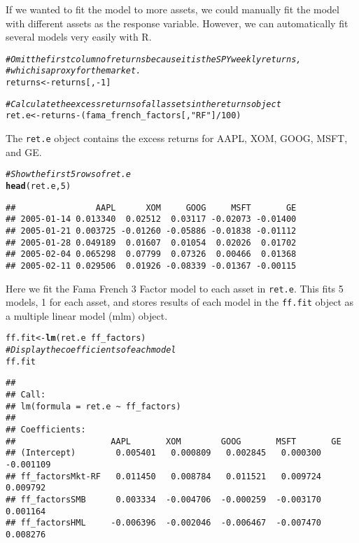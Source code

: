 \documentclass[a4paper]{article}\usepackage[]{graphicx}\usepackage[]{color}
\makeatletter
\newcommand{\hlstr}[1]{\textcolor[rgb]{0.192,0.494,0.8}{#1}}%
\newcommand{\hlcom}[1]{\textcolor[rgb]{0.678,0.584,0.686}{\textit{#1}}}%
\newcommand{\hlkwd}[1]{\textcolor[rgb]{0.737,0.353,0.396}{\textbf{#1}}}%
\newenvironment{kframe}{%
 \def\at@end@of@kframe{}%
 \ifinner\ifhmode%
  \def\at@end@of@kframe{\end{minipage}}%
  \begin{minipage}{\columnwidth}%
 \fi\fi%
 \def\FrameCommand##1{\hskip\@totalleftmargin \hskip-\fboxsep
 \colorbox{shadecolor}{##1}\hskip-\fboxsep
     \hskip-\linewidth \hskip-\@totalleftmargin \hskip\columnwidth}%
 \MakeFramed {\advance\hsize-\width
   \@totalleftmargin\z@ \linewidth\hsize
   \@setminipage}}%
 {\par\unskip\endMakeFramed%
 \at@end@of@kframe}
\newenvironment{knitrout}{}{} %
\makeatother
\begin{document}
If we wanted to fit the model to more assets, we could manually fit the model with different assets as the response variable. However, we can automatically fit several models very easily with R.

\begin{knitrout}
\color{fgcolor}\begin{kframe}
\begin{alltt}
\hlcom{# Omit the first column of returns because it is the SPY weekly returns,}
\hlcom{# which is a proxy for the market.}
returns <- returns[, -1]

\hlcom{# Calculate the excess returns of all assets in the returns object}
ret.e <- returns - (fama_french_factors[, \hlstr{"RF"}]/100) %*% \hlkwd{rep}(1, \hlkwd{ncol}(returns))
\end{alltt}
\end{kframe}
\end{knitrout}


The \verb"ret.e" object contains the excess returns for AAPL, XOM, GOOG, MSFT, and GE.
\begin{knitrout}
\color{fgcolor}\begin{kframe}
\begin{alltt}
\hlcom{# Show the first 5 rows of ret.e}
\hlkwd{head}(ret.e, 5)
\end{alltt}
\begin{verbatim}
##                AAPL      XOM     GOOG     MSFT       GE
## 2005-01-14 0.013340  0.02512  0.03117 -0.02073 -0.01400
## 2005-01-21 0.003725 -0.01260 -0.05886 -0.01838 -0.01112
## 2005-01-28 0.049189  0.01607  0.01054  0.02026  0.01702
## 2005-02-04 0.065298  0.07799  0.07326  0.00466  0.01368
## 2005-02-11 0.029506  0.01926 -0.08339 -0.01367 -0.00115
\end{verbatim}
\end{kframe}
\end{knitrout}


Here we fit the Fama French 3 Factor model to each asset in \verb"ret.e". This fits 5 models, 1 for each asset, and stores results of each model in the \verb"ff.fit" object as a multiple linear model (mlm) object.
\begin{knitrout}
\color{fgcolor}\begin{kframe}
\begin{alltt}
ff.fit <- \hlkwd{lm}(ret.e ~ ff_factors)
\hlcom{# Display the coefficients of each model}
ff.fit
\end{alltt}
\begin{verbatim}
## 
## Call:
## lm(formula = ret.e ~ ff_factors)
## 
## Coefficients:
##                   AAPL       XOM        GOOG       MSFT       GE       
## (Intercept)        0.005401   0.000809   0.002845   0.000300  -0.001109
## ff_factorsMkt-RF   0.011450   0.008784   0.011521   0.009724   0.009792
## ff_factorsSMB      0.003334  -0.004706  -0.000259  -0.003170   0.001164
## ff_factorsHML     -0.006396  -0.002046  -0.006467  -0.007470   0.008276
\end{verbatim}
\end{kframe}
\end{knitrout}
\end{document}
